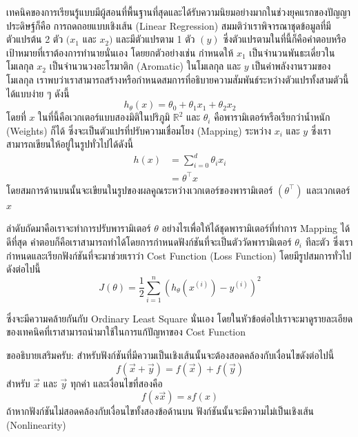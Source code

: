 เทคนิคของการเรียนรู้แบบมีผู้สอนที่พื้นฐานที่สุดและได้รับความนิยมอย่างมากในช่วงยุคแรกของปัญญาประดิษฐ์ก็คือ การถดถอยแบบเชิงเส้น (Linear Regression) สมมติว่าเราพิจารณาชุดข้อมูลที่มีตัวแปรต้น 2 ตัว $(x_{1}$ และ $x_{2})$ และมีตัวแปรตาม 1 ตัว $(y)$ ซึ่งตัวแปรตามในที่นี้ก็คือคำตอบหรือเป้าหมายที่เราต้องการทำนายนั่นเอง โดยยกตัวอย่างเช่น กำหนดให้ $x_{1}$ เป็นจำนวนพันธะเดี่ยวในโมเลกุล $x_{2}$ เป็นจำนวนวงอะโรมาติก (Aromatic) ในโมเลกุล และ $y$ เป็นค่าพลังงานรวมของโมเลกุล เราพบว่าเราสามารถสร้างหรือกำหนดสมการที่อธิบายความสัมพันธ์ระหว่างตัวแปรทั้งสามตัวนี้ได้แบบง่าย ๆ ดังนี้
%
\begin{equation}
    h_\theta(x) = \theta_0 + \theta_1 x_1 + \theta_2 x_2
\end{equation}
%
\noindent โดยที่ $x$ ในที่นี้คือเวกเตอร์แบบสองมิติในปริภูมิ $\mathbb{R}^{2}$ และ $\theta_{i}$ คือพารามิเตอร์หรือเรียกว่าน้ำหนัก (Weights) ก็ได้ ซึ่งจะเป็นตัวแปรที่ปรับความเชื่อมโยง (Mapping) ระหว่าง $x_{i}$ และ $y$ ซึ่งเราสามารถเขียนให้อยู่ในรูปทั่วไปได้ดังนี้
%
\begin{align}
    h(x) & = \sum_{i=0}^{d} \theta_{i} x_{i} \\
         & = \theta^{\top} x
\end{align}
%
\noindent โดยสมการด้านบนนั้นจะเขียนในรูปของผลคูณระหว่างเวกเตอร์ของพารามิเตอร์ $(\theta^{\top})$ และเวกเตอร์ $x$

ลำดับถัดมาคือเราจะทำการปรับพารามิเตอร์ $\theta$ อย่างไรเพื่อให้ได้ชุดพารามิเตอร์ที่ทำการ Mapping ได้ดีที่สุด คำตอบก็คือเราสามารถทำได้โดยการกำหนดฟังก์ชันที่จะเป็นตัววัดพารามิเตอร์ $\theta_{i}$ ทีละตัว ซึ่งเรากำหนดและเรียกฟังก์ชันที่จะมาช่วยเราว่า Cost Function (Loss Function) โดยมีรูปสมการทั่วไปดังต่อไปนี้
%
\begin{equation}
    J(\theta) = \frac 1 2 \sum_{i=1}^n \left( h_\theta(x^{(i)}) - y^{(i)} \right)^2
\end{equation}

\noindent ซึ่งจะมีความคล้ายกันกับ Ordinary Least Square นั่นเอง โดยในหัวข้อต่อไปเราจะมาดูรายละเอียดของเทคนิคที่เราสามารถนำมาใช้ในการแก้ปัญหาของ Cost Function

ขออธิบายเสริมครับ: สำหรับฟังก์ชันที่มีความเป็นเชิงเส้นนั้นจะต้องสอดคล้องกับเงื่อนไขดังต่อไปนี้
%
\begin{equation}
    f(\vec{x} + \vec{y}) = f(\vec{x}) + f(\vec{y})
\end{equation}
%
\noindent สำหรับ $\vec{x}$ และ $\vec{y}$ ทุกค่า และเงื่อนไขที่สองคือ
%
\begin{equation}
    f(s\vec{x}) = sf(x)
\end{equation}
%
ถ้าหากฟังก์ชันไม่สอดคล้องกับเงื่อนไขทั้งสองข้อด้านบน ฟังก์ชันนั้นจะมีความไม่เป็นเชิงเส้น (Nonlinearity)

